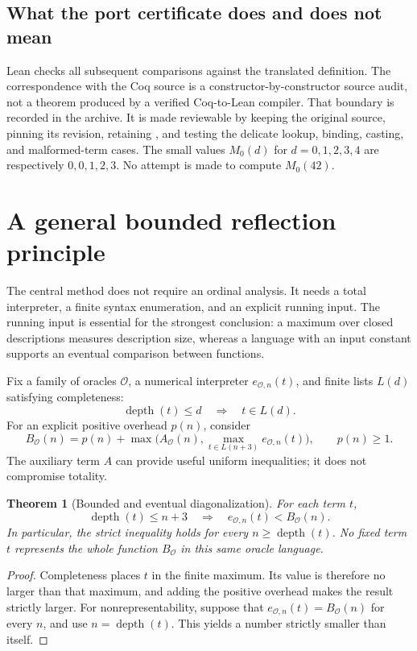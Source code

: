 \documentclass[11pt,a4paper]{article}
\newtheorem{theorem}{Theorem}[section]
\theoremstyle{definition}
\newcommand{\dep}{\operatorname{depth}}
\newcommand{\code}[1]{\texttt{\detokenize{#1}}}
\begin{document}
\subsection{What the port certificate does and does not mean}

Lean checks all subsequent comparisons against the translated definition.
The correspondence with the Coq source is a constructor-by-constructor
source audit, not a theorem produced by a verified Coq-to-Lean compiler.
That boundary is recorded in the archive. It is made reviewable by keeping
the original source, pinning its revision, retaining \code{maxBy}, and testing
the delicate lookup, binding, casting, and malformed-term cases. The small
values \(M_0(d)\) for \(d=0,1,2,3,4\) are respectively
\(0,0,1,2,3\). No attempt is made to compute \(M_0(42)\).

\section{A general bounded reflection principle}
\label{sec:reflection}

The central method does not require an ordinal analysis. It needs a total
interpreter, a finite syntax enumeration, and an explicit running input.
The running input is essential for the strongest conclusion: a maximum over
closed descriptions measures description size, whereas a language with an
input constant supports an eventual comparison between functions.

Fix a family of oracles \(\mathcal O\), a numerical interpreter
\(e_{\mathcal O,n}(t)\), and finite lists \(L(d)\) satisfying completeness:
\[
          \dep(t)\le d\quad\Longrightarrow\quad t\in L(d).
\]
For an explicit positive overhead \(p(n)\), consider
\[
 B_{\mathcal O}(n)=p(n)+
     \max\bigl(A_{\mathcal O}(n),
                \max_{t\in L(n+3)}e_{\mathcal O,n}(t)\bigr),
 \qquad p(n)\ge1.
\]
The auxiliary term \(A\) can provide useful uniform inequalities; it does
not compromise totality.

\begin{theorem}[Bounded and eventual diagonalization]
For each term \(t\),
\[
 \dep(t)\le n+3\quad\Longrightarrow\quad
 e_{\mathcal O,n}(t)<B_{\mathcal O}(n).
\]
In particular, the strict inequality holds for every \(n\ge\dep(t)\).
No fixed term \(t\) represents the whole function \(B_{\mathcal O}\) in this
same oracle language.
\end{theorem}
\begin{proof}
Completeness places \(t\) in the finite maximum. Its value is therefore no
larger than that maximum, and adding the positive overhead makes the result
strictly larger. For nonrepresentability, suppose that
\(e_{\mathcal O,n}(t)=B_{\mathcal O}(n)\) for every \(n\), and use
\(n=\dep(t)\). This yields a number strictly smaller than itself.
\end{proof}
\end{document}
